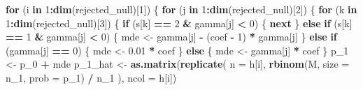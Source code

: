 \documentclass[
]{article}
\newenvironment{Shaded}{\begin{snugshade}}{\end{snugshade}}
\newcommand{\ControlFlowTok}[1]{\textcolor[rgb]{0.13,0.29,0.53}{\textbf{#1}}}
\newcommand{\DataTypeTok}[1]{\textcolor[rgb]{0.13,0.29,0.53}{#1}}
\newcommand{\DecValTok}[1]{\textcolor[rgb]{0.00,0.00,0.81}{#1}}
\newcommand{\FloatTok}[1]{\textcolor[rgb]{0.00,0.00,0.81}{#1}}
\newcommand{\KeywordTok}[1]{\textcolor[rgb]{0.13,0.29,0.53}{\textbf{#1}}}
\newcommand{\NormalTok}[1]{#1}
\newcommand{\OperatorTok}[1]{\textcolor[rgb]{0.81,0.36,0.00}{\textbf{#1}}}
\newcommand{\StringTok}[1]{\textcolor[rgb]{0.31,0.60,0.02}{#1}}
\begin{document}
\begin{Shaded}
\begin{Highlighting}[]
{\ControlFlowTok{for}\NormalTok{ (i }\ControlFlowTok{in} \DecValTok{1}\OperatorTok{:}\KeywordTok{dim}\NormalTok{(rejected_null)[}\DecValTok{1}\NormalTok{]) \{}
  \ControlFlowTok{for}\NormalTok{ (j }\ControlFlowTok{in} \DecValTok{1}\OperatorTok{:}\KeywordTok{dim}\NormalTok{(rejected_null)[}\DecValTok{2}\NormalTok{]) \{}
    \ControlFlowTok{for}\NormalTok{ (k }\ControlFlowTok{in} \DecValTok{1}\OperatorTok{:}\KeywordTok{dim}\NormalTok{(rejected_null)[}\DecValTok{3}\NormalTok{]) \{}
      \ControlFlowTok{if}\NormalTok{ (s[k] }\OperatorTok{==}\StringTok{ }\DecValTok{2} \OperatorTok{&}\StringTok{ }\NormalTok{gamma[j] }\OperatorTok{<}\StringTok{ }\DecValTok{0}\NormalTok{) \{}
        \ControlFlowTok{next}
\NormalTok{      \} }\ControlFlowTok{else} \ControlFlowTok{if}\NormalTok{ (s[k] }\OperatorTok{==}\StringTok{ }\DecValTok{1} \OperatorTok{&}\StringTok{ }\NormalTok{gamma[j] }\OperatorTok{<}\StringTok{ }\DecValTok{0}\NormalTok{) \{}
\NormalTok{        mde <-}\StringTok{ }\NormalTok{gamma[j] }\OperatorTok{-}\StringTok{ }\NormalTok{(coef }\OperatorTok{-}\StringTok{ }\DecValTok{1}\NormalTok{) }\OperatorTok{*}\StringTok{ }\NormalTok{gamma[j]}
\NormalTok{      \} }\ControlFlowTok{else} \ControlFlowTok{if}\NormalTok{ (gamma[j] }\OperatorTok{==}\StringTok{ }\DecValTok{0}\NormalTok{) \{}
\NormalTok{        mde <-}\StringTok{ }\FloatTok{0.01} \OperatorTok{*}\StringTok{ }\NormalTok{coef}
\NormalTok{      \} }\ControlFlowTok{else}\NormalTok{ \{}
\NormalTok{        mde <-}\StringTok{ }\NormalTok{gamma[j] }\OperatorTok{*}\StringTok{ }\NormalTok{coef}
\NormalTok{      \}}
\NormalTok{      p_}\DecValTok{1}\NormalTok{ <-}\StringTok{ }\NormalTok{p_}\DecValTok{0} \OperatorTok{+}\StringTok{ }\NormalTok{mde}
\NormalTok{      p_}\DecValTok{1}\NormalTok{_hat <-}\StringTok{ }\KeywordTok{as.matrix}\NormalTok{(}\KeywordTok{replicate}\NormalTok{(}
        \DataTypeTok{n =}\NormalTok{ h[i],}
        \KeywordTok{rbinom}\NormalTok{(M, }\DataTypeTok{size =}\NormalTok{ n_}\DecValTok{1}\NormalTok{, }\DataTypeTok{prob =}\NormalTok{ p_}\DecValTok{1}\NormalTok{) }\OperatorTok{/}\StringTok{ }\NormalTok{n_}\DecValTok{1}
\NormalTok{      ), }\DataTypeTok{ncol =}\NormalTok{ h[i])}

}
\end{Highlighting}
\end{Shaded}
\end{document}
